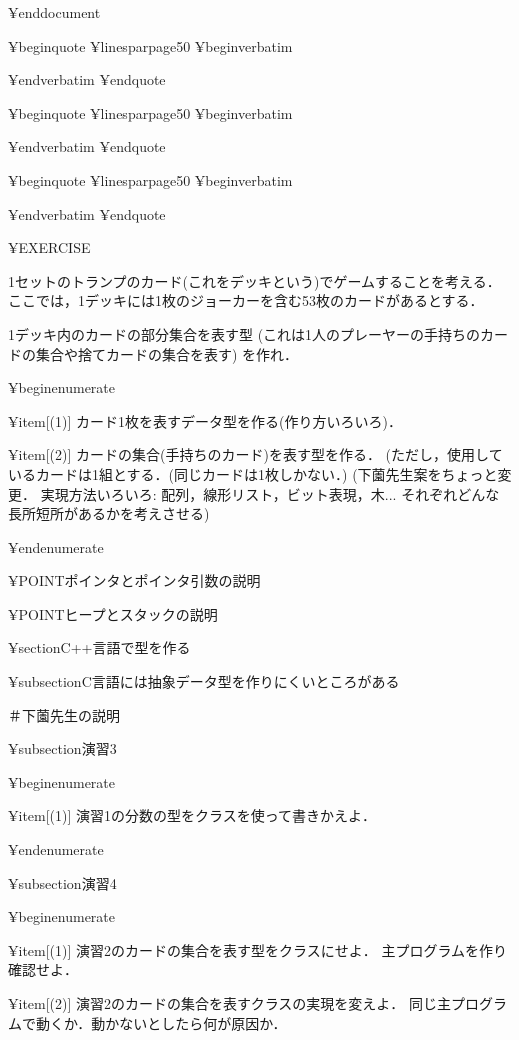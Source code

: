{{{{{¥end{document}

¥begin{quote}
¥linesparpage{50}
¥begin{verbatim}

¥end{verbatim}
¥end{quote}

¥begin{quote}
¥linesparpage{50}
¥begin{verbatim}

¥end{verbatim}
¥end{quote}

¥begin{quote}
¥linesparpage{50}
¥begin{verbatim}

¥end{verbatim}
¥end{quote}






¥EXERCISE{

1セットのトランプのカード(これをデッキという)でゲームすることを考える．
ここでは，1デッキには1枚のジョーカーを含む53枚のカードがあるとする．

1デッキ内のカードの部分集合を表す型
(これは1人のプレーヤーの手持ちのカードの集合や捨てカードの集合を表す)
を作れ．

}

¥begin{enumerate}

 ¥item[(1)] カード1枚を表すデータ型を作る(作り方いろいろ)．

 ¥item[(2)] カードの集合(手持ちのカード)を表す型を作る．
(ただし，使用しているカードは1組とする．(同じカードは1枚しかない．)
(下薗先生案をちょっと変更．
実現方法いろいろ: 配列，線形リスト，ビット表現，木...
それぞれどんな長所短所があるかを考えさせる)

¥end{enumerate}

¥POINT{ポインタとポインタ引数の説明}{}

¥POINT{ヒープとスタックの説明}{}

¥section{C++言語で型を作る}

¥subsection{C言語には抽象データ型を作りにくいところがある}

＃下薗先生の説明

¥subsection{演習3}

¥begin{enumerate}

 ¥item[(1)] 演習1の分数の型をクラスを使って書きかえよ．

¥end{enumerate}

¥subsection{演習4}

¥begin{enumerate}

 ¥item[(1)] 演習2のカードの集合を表す型をクラスにせよ．
主プログラムを作り確認せよ．

 ¥item[(2)] 演習2のカードの集合を表すクラスの実現を変えよ．
同じ主プログラムで動くか．動かないとしたら何が原因か．

}}}}}
